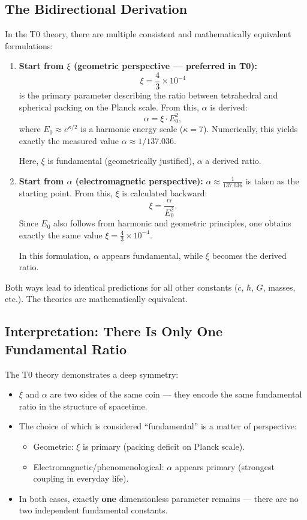 	\subsection{The Bidirectional Derivation}
	In the T0 theory, there are multiple consistent and mathematically equivalent formulations:
	\begin{enumerate}
		\item \textbf{Start from $\xi$ (geometric perspective --- preferred in T0):}
		\[
		\xi = \frac{4}{3} \times 10^{-4}
		\]
		is the primary parameter describing the ratio between tetrahedral and spherical packing on the Planck scale. From this, $\alpha$ is derived:
		\[
		\alpha = \xi \cdot E_0^2 ,
		\]
		where $E_0 \approx e^{\kappa/2}$ is a harmonic energy scale ($\kappa = 7$). Numerically, this yields exactly the measured value $\alpha \approx 1/137.036$.
		
		Here, $\xi$ is fundamental (geometrically justified), $\alpha$ a derived ratio.
		
		\item \textbf{Start from $\alpha$ (electromagnetic perspective):}
		$\alpha \approx \frac{1}{137.036}$
		is taken as the starting point. From this, $\xi$ is calculated backward:
		\[
		\xi = \frac{\alpha}{E_0^2} .
		\]
		Since $E_0$ also follows from harmonic and geometric principles, one obtains exactly the same value $\xi = \frac{4}{3} \times 10^{-4}$.
		
		In this formulation, $\alpha$ appears fundamental, while $\xi$ becomes the derived ratio.
	\end{enumerate}
	
	Both ways lead to identical predictions for all other constants ($c$, $\hbar$, $G$, masses, etc.). The theories are mathematically equivalent.
	
	\subsection{Interpretation: There Is Only One Fundamental Ratio}
	The T0 theory demonstrates a deep symmetry:
	\begin{itemize}
		\item $\xi$ and $\alpha$ are two sides of the same coin --- they encode the same fundamental ratio in the structure of spacetime.
		\item The choice of which is considered ``fundamental'' is a matter of perspective:
		\begin{itemize}
			\item Geometric: $\xi$ is primary (packing deficit on Planck scale).
			\item Electromagnetic/phenomenological: $\alpha$ appears primary (strongest coupling in everyday life).
		\end{itemize}
		\item In both cases, exactly \textbf{one} dimensionless parameter remains --- there are no two independent fundamental constants.
	\end{itemize}
	
